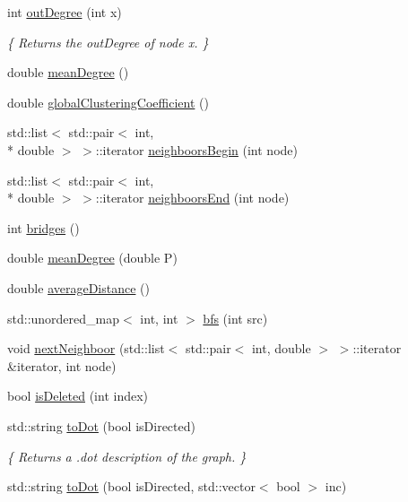 \begin{DoxyCompactItemize}
int \hyperlink{classamon_1_1_graph_a2500d2f93404a3ce691396db4ca0ea92}{out\-Degree} (int x)
\begin{DoxyCompactList}\small\item\em \{ Returns the out\-Degree of node x. \} \end{DoxyCompactList}\item 
double \hyperlink{classamon_1_1_graph_ac97e95d56f333fa63755458cc9443cc6}{mean\-Degree} ()
\item 
double \hyperlink{classamon_1_1_graph_a6e9098ead3849a382e3a5d1949599947}{global\-Clustering\-Coefficient} ()
\item 
std\-::list$<$ std\-::pair$<$ int, \\*
double $>$ $>$\-::iterator \hyperlink{classamon_1_1_graph_a182d3611b27058fda589269589b62b41}{neighboors\-Begin} (int node)
\item 
std\-::list$<$ std\-::pair$<$ int, \\*
double $>$ $>$\-::iterator \hyperlink{classamon_1_1_graph_acaeb02df5f8d9bd71cf4aae11e89532f}{neighboors\-End} (int node)
\item 
int \hyperlink{classamon_1_1_graph_a0ea3919c713485cfc5b24fe3ef1aaf24}{bridges} ()
\item 
double \hyperlink{classamon_1_1_graph_a31712319c837723444fc5f83a272b41d}{mean\-Degree} (double P)
\item 
double \hyperlink{classamon_1_1_graph_ac0e052c99a3842aa205480156217c52b}{average\-Distance} ()
\item 
std\-::unordered\-\_\-map$<$ int, int $>$ \hyperlink{classamon_1_1_graph_a658ec90c39eb57958a286574cf463224}{bfs} (int src)
\item 
void \hyperlink{classamon_1_1_graph_a88ee59e7d320f210c4bb9eb1e4eff476}{next\-Neighboor} (std\-::list$<$ std\-::pair$<$ int, double $>$ $>$\-::iterator \&iterator, int node)
\item 
bool \hyperlink{classamon_1_1_graph_a17d2727539c869cb0a047d81b0236dad}{is\-Deleted} (int index)
\item 
std\-::string \hyperlink{classamon_1_1_graph_ad18818eecab5f005c6c3a12ca2461c52}{to\-Dot} (bool is\-Directed)
\begin{DoxyCompactList}\small\item\em \{ Returns a .dot description of the graph. \} \end{DoxyCompactList}\item 
std\-::string \hyperlink{classamon_1_1_graph_ad2c36a69520088dd76da23e13b372464}{to\-Dot} (bool is\-Directed, std\-::vector$<$ bool $>$ inc)

\end{DoxyCompactItemize}
